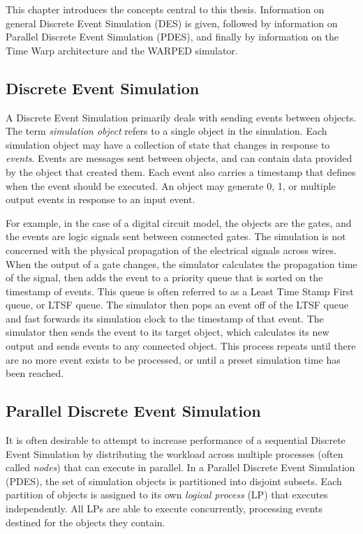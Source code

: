 \documentclass[11pt]{book}
\begin{document}
This chapter introduces the concepts central to this thesis. Information on general Discrete Event Simulation (DES) is given, followed by information on Parallel Discrete Event Simulation (PDES), and finally by information on the Time Warp architecture and the WARPED simulator.

\subsection{Discrete Event Simulation}

A Discrete Event Simulation primarily deals with sending events between objects. The term \emph{simulation object} refers to a single object in the simulation. Each simulation object may have a collection of state that changes in response to \emph{events}. Events are messages sent between objects, and can contain data provided by the object that created them. Each event also carries a timestamp that defines when the event should be executed. An object may generate 0, 1, or multiple output events in response to an input event. 

For example, in the case of a digital circuit model, the objects are the gates, and the events are logic signals sent between connected gates. The simulation is not concerned with the physical propagation of the electrical signals across wires. When the output of a gate changes, the simulator calculates the propagation time of the signal, then adds the event to a priority queue that is sorted on the timestamp of events. This queue is often referred to as a Least Time Stamp First queue, or LTSF queue. The simulator then pops an event off of the LTSF queue and fast forwards its simulation clock to the timestamp of that event. The simulator then sends the event to its target object, which calculates its new output and sends events to any connected object. This process repeats until there are no more event exists to be processed, or until a preset simulation time has been reached.

\subsection{Parallel Discrete Event Simulation}

It is often desirable to attempt to increase performance of a sequential Discrete Event Simulation by distributing the workload across multiple processes (often called \emph{nodes}) that can execute in parallel. In a Parallel Discrete Event Simulation (PDES), the set of simulation objects is partitioned into disjoint subsets. Each partition of objects is assigned to its own \emph{logical process} (LP) that executes independently. All LPs are able to execute concurrently, processing events destined for the objects they contain. 
\end{document}
